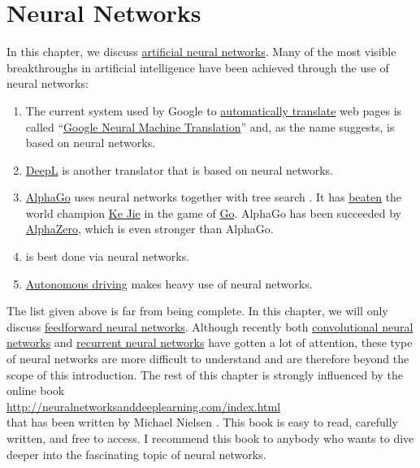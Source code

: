 \chapter{Neural Networks}
In this chapter, we discuss \href{https://en.wikipedia.org/wiki/Artificial_neural_network}{artificial neural networks}.
Many of the most visible breakthroughs in artificial intelligence have been achieved through the use of neural
networks: 
\begin{enumerate}
\item The current system used by Google to \href{https://translate.google.com}{automatically translate} web
      pages is called 
      ``\href{https://en.wikipedia.org/wiki/Google_Neural_Machine_Translation}{Google Neural Machine Translation}''
      and, as the name suggests, is based on neural networks. 
\item \href{https://www.deepl.com/translator}{DeepL} is another translator that is based on neural networks.      
\item \href{https://en.wikipedia.org/wiki/AlphaGo}{AlphaGo} uses neural networks together with tree search
      \cite{silver:2016}.  It has \href{https://en.wikipedia.org/wiki/AlphaGo_versus_Ke_Jie}{beaten} 
      the world champion \href{https://en.wikipedia.org/wiki/Ke_Jie}{Ke Jie} in the game of
      \href{https://en.wikipedia.org/wiki/Go_(game)}{Go}. AlphaGo has been succeeded by
      \href{https://en.wikipedia.org/wiki/AlphaZero}{AlphaZero}, which is even stronger than AlphaGo.
\item {} is best done via neural networks.
\item \href{https://en.wikipedia.org/wiki/Autonomous_car}{Autonomous driving} makes heavy use of neural networks.
\end{enumerate}
The list given above is far from being complete.  In this chapter, we will only discuss 
\href{https://en.wikipedia.org/wiki/Feedforward_neural_network}{feedforward neural networks}.  Although recently both 
\href{https://en.wikipedia.org/wiki/Convolutional_neural_network}{convolutional neural networks} and
\href{https://en.wikipedia.org/wiki/Recurrent_neural_network}{recurrent neural networks} have gotten a lot of
attention, these type of neural networks are more difficult to understand and are therefore beyond the scope of this
introduction.  The rest of this chapter is strongly influenced by the online book 
\\[0.2cm]
\hspace*{1.3cm}
\href{http://neuralnetworksanddeeplearning.com/index.html}{http://neuralnetworksanddeeplearning.com/index.html}
\\[0.2cm]
that has been written by Michael Nielsen \cite{nielsen:2015}.  This book is easy to read, carefully written, and
free to access.  I recommend this book to anybody who wants to dive deeper into the fascinating topic of neural
networks.


